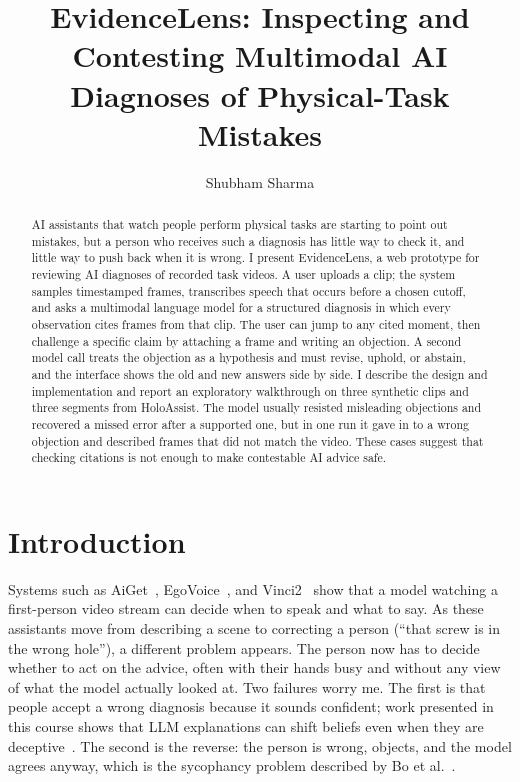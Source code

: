 \documentclass[sigconf]{acmart}
\begin{document}
\raggedbottom

\title{EvidenceLens: Inspecting and Contesting Multimodal AI Diagnoses of Physical-Task Mistakes}

\author{Shubham Sharma}

\begin{abstract}
AI assistants that watch people perform physical tasks are starting to point out mistakes, but a person who receives such a diagnosis has little way to check it, and little way to push back when it is wrong. I present EvidenceLens, a web prototype for reviewing AI diagnoses of recorded task videos. A user uploads a clip; the system samples timestamped frames, transcribes speech that occurs before a chosen cutoff, and asks a multimodal language model for a structured diagnosis in which every observation cites frames from that clip. The user can jump to any cited moment, then challenge a specific claim by attaching a frame and writing an objection. A second model call treats the objection as a hypothesis and must revise, uphold, or abstain, and the interface shows the old and new answers side by side. I describe the design and implementation and report an exploratory walkthrough on three synthetic clips and three segments from HoloAssist. The model usually resisted misleading objections and recovered a missed error after a supported one, but in one run it gave in to a wrong objection and described frames that did not match the video. These cases suggest that checking citations is not enough to make contestable AI advice safe.
\end{abstract}


\maketitle

\section{Introduction}

Systems such as AiGet~\cite{cai2025aiget}, EgoVoice~\cite{kim2026egovoice}, and Vinci2~\cite{gong2026vinci2} show that a model watching a first-person video stream can decide when to speak and what to say. As these assistants move from describing a scene to correcting a person (``that screw is in the wrong hole''), a different problem appears. The person now has to decide whether to act on the advice, often with their hands busy and without any view of what the model actually looked at. Two failures worry me. The first is that people accept a wrong diagnosis because it sounds confident; work presented in this course shows that LLM explanations can shift beliefs even when they are deceptive~\cite{danry2025deceptive}. The second is the reverse: the person is wrong, objects, and the model agrees anyway, which is the sycophancy problem described by Bo et al.~\cite{bo2026saboteurs}.
\end{document}
